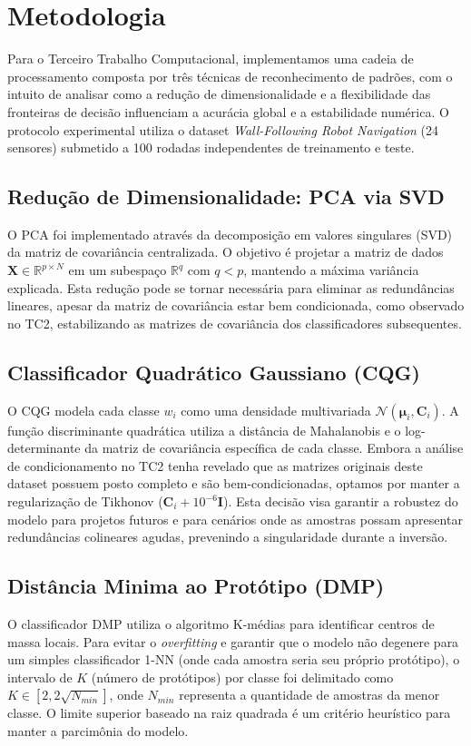 \section{Metodologia}
\label{chap:metodologia}

Para o Terceiro Trabalho Computacional, implementamos uma cadeia de processamento composta por três técnicas de reconhecimento de padrões, com o intuito de analisar como a redução de dimensionalidade e a flexibilidade das fronteiras de decisão influenciam a acurácia global e a estabilidade numérica. O protocolo experimental utiliza o dataset \textit{Wall-Following Robot Navigation} (24 sensores) submetido a 100 rodadas independentes de treinamento e teste.

\subsection{Redução de Dimensionalidade: PCA via SVD}
O PCA foi implementado através da decomposição em valores singulares (SVD) da matriz de covariância centralizada. O objetivo é projetar a matriz de dados $\mathbf{X} \in \mathbb{R}^{p \times N}$ em um subespaço $\mathbb{R}^{q}$ com $q < p$, mantendo a máxima variância explicada. Esta redução pode se tornar necessária para eliminar as redundâncias lineares, apesar da matriz de covariância estar bem condicionada, como observado no TC2, estabilizando as matrizes de covariância dos classificadores subsequentes.

\subsection{Classificador Quadrático Gaussiano (CQG)}
O CQG modela cada classe $w_i$ como uma densidade multivariada $\mathcal{N}(\boldsymbol{\mu}_i, \mathbf{C}_i)$. A função discriminante quadrática utiliza a distância de Mahalanobis e o log-determinante da matriz de covariância específica de cada classe. Embora a análise de condicionamento no TC2 tenha revelado que as matrizes originais deste dataset possuem posto completo e são bem-condicionadas, optamos por manter a regularização de Tikhonov ($\mathbf{C}_i + 10^{-6} \mathbf{I}$). Esta decisão visa garantir a robustez do modelo para projetos futuros e para cenários onde as amostras possam apresentar redundâncias colineares agudas, prevenindo a singularidade durante a inversão.

\subsection{Distância Minima ao Protótipo (DMP)}
O classificador DMP utiliza o algoritmo K-médias para identificar centros de massa locais. Para evitar o \textit{overfitting} e garantir que o modelo não degenere para um simples classificador 1-NN (onde cada amostra seria seu próprio protótipo), o intervalo de $K$ (número de protótipos) por classe foi delimitado como $K \in [2, 2\sqrt{N_{min}}]$, onde $N_{min}$ representa a quantidade de amostras da menor classe. O limite superior baseado na raiz quadrada é um critério heurístico para manter a parcimônia do modelo.

